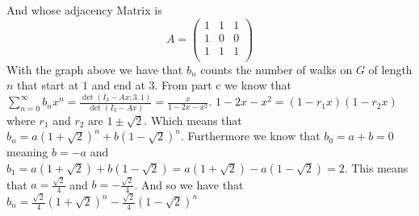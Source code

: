 \documentclass[12pt]{amsart}
\theoremstyle{definition}
\begin{document}
\begin{itemize}[align=left]
\begin{itemize}
        \begin{center}
        \end{center}

        And whose adjacency Matrix is 
        $$A=\begin{pmatrix}
            1 & 1 & 1\\ 1 & 0 & 0\\ 1 & 1 & 1\\
        \end{pmatrix}$$
        With the graph above we have that $b_n$ counts the number of walks on $G$ of length $n$ that start at $1$ and end at $3$. %
        From part c we know that 
        $\sum_{n=0}^{\infty}b_nx^n=\frac{\det(I_3-Ax;3,1)}{\det(I_3-Ax)}=\frac{x}{1-2x-x^2}$. $1-2x-x^2=(1-r_1x)(1-r_2x)$ where $r_1$ and $r_2$ are $1\pm \sqrt{2}$. Which means that $b_n=a(1+ \sqrt{2})^n+b(1- \sqrt{2})^n$. Furthermore we know that $b_0=a+b=0$ meaning $b=-a$ and $b_1=a(1+ \sqrt{2})+b(1- \sqrt{2})=a(1+ \sqrt{2})-a(1- \sqrt{2})=2$. This means that $a=\frac{\sqrt 2}{4}$ and $b=-\frac{\sqrt 2}{4}$. And so we have that $b_n=\frac{\sqrt 2}{4}(1+ \sqrt{2})^n-\frac{\sqrt 2}{4}(1- \sqrt{2})^n$
    \end{itemize}

    
\end{itemize}
\end{document}
